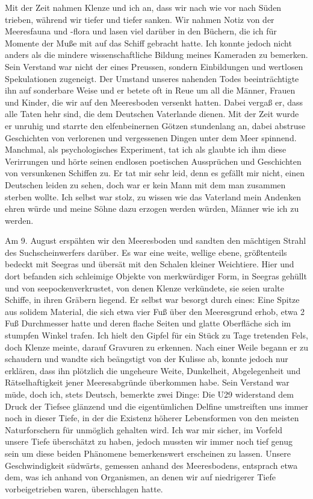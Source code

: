 \documentclass[a4paper]{memoir}
\begin{document}
Mit der Zeit nahmen Klenze und ich an, dass wir nach wie vor nach Süden trieben, während wir tiefer und tiefer sanken. Wir nahmen Notiz von der Meeresfauna und -flora und lasen viel darüber in den Büchern, die ich für Momente der Muße mit auf das Schiff gebracht hatte. Ich konnte jedoch nicht anders als die mindere wissenschaftliche Bildung meines Kameraden zu bemerken. Sein Verstand war nicht der eines Preussen, sondern Einbildungen und wertlosen Spekulationen zugeneigt. Der Umstand unseres nahenden Todes beeinträchtigte ihn auf sonderbare Weise und er betete oft in Reue um all die Männer, Frauen und Kinder, die wir auf den Meeresboden versenkt hatten. Dabei vergaß er, dass alle Taten hehr sind, die dem Deutschen Vaterlande dienen.
Mit der Zeit wurde er unruhig und starrte den elfenbeinernen Götzen stundenlang an, dabei abstruse Geschichten von verlorenen und vergessenen Dingen unter dem Meer spinnend. Manchmal, als psychologisches Experiment, tat ich als glaubte ich ihm diese Verirrungen und hörte seinen endlosen poetischen Aussprüchen und Geschichten von versunkenen Schiffen zu. Er tat mir sehr leid, denn es gefällt mir nicht, einen Deutschen leiden zu sehen, doch war er kein Mann mit dem man zusammen sterben wollte. Ich selbst war stolz, zu wissen wie das Vaterland mein Andenken ehren würde und meine Söhne dazu erzogen werden würden, Männer wie ich zu werden.

Am 9. August erspähten wir den Meeresboden und sandten den mächtigen Strahl des Suchscheinwerfers darüber. Es war eine weite, wellige ebene, größtenteils bedeckt mit Seegras und übersät mit den Schalen kleiner Weichtiere. Hier und dort befanden sich schleimige Objekte von merkwürdiger Form, in Seegras gehüllt und von seepockenverkrustet, von denen Klenze verkündete, sie seien uralte Schiffe, in ihren Gräbern liegend. Er selbst war besorgt durch eines: Eine Spitze aus solidem Material, die sich etwa vier Fuß über den Meeresgrund erhob, etwa 2 Fuß Durchmesser hatte und deren flache Seiten und glatte Oberfläche sich im stumpfen Winkel trafen. Ich hielt den Gipfel für ein Stück zu Tage tretenden Fels, doch Klenze meinte, darauf Gravuren zu erkennen. Nach einer Weile begann er zu schaudern und wandte sich beängstigt von der Kulisse ab, konnte jedoch nur erklären, dass ihn plötzlich die ungeheure Weite, Dunkelheit, Abgelegenheit und Rätselhaftigkeit jener Meeresabgründe überkommen habe. Sein Verstand war müde, doch ich, stets Deutsch, bemerkte zwei Dinge: Die U29 widerstand dem Druck der Tiefsee glänzend und die eigentümlichen Delfine umstreiften uns immer noch in dieser Tiefe, in der die Existenz höherer Lebensformen von den meisten Naturforschern für unmöglich gehalten wird. Ich war mir sicher, im Vorfeld unsere Tiefe überschätzt zu haben, jedoch mussten wir immer noch tief genug sein um diese beiden Phänomene bemerkenswert erscheinen zu lassen. Unsere Geschwindigkeit südwärts, gemessen anhand des Meeresbodens, entsprach etwa dem, was ich anhand von Organismen, an denen wir auf niedrigerer Tiefe vorbeigetrieben waren, überschlagen hatte.
\end{document}
